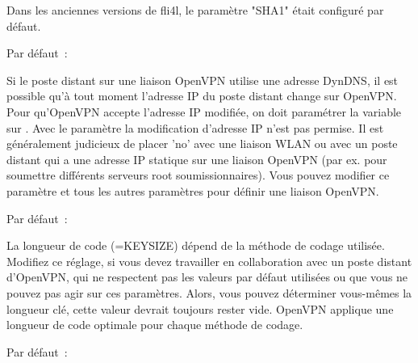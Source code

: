 \begin{description}

  Dans les anciennes versions de fli4l, le paramètre "SHA1" était configuré par défaut.


  Par défaut~: 

  Si le poste distant sur une liaison OpenVPN utilise une adresse DynDNS, il est
  possible qu'à tout moment l'adresse IP du poste distant change sur OpenVPN.
  Pour qu'OpenVPN accepte l'adresse IP modifiée, on doit paramétrer la variable
   sur . Avec le paramètre  la
  modification d'adresse IP n'est pas permise. Il est généralement judicieux
  de placer 'no' avec une liaison WLAN ou avec un poste distant qui a une adresse IP
  statique sur une liaison OpenVPN (par ex. pour soumettre différents serveurs
  root soumissionnaires). Vous pouvez modifier ce paramètre et tous les autres
  paramètres  pour définir une liaison OpenVPN.


  Par défaut~: 

  La longueur de code (=KEYSIZE) dépend de la méthode de codage utilisée. Modifiez
  ce réglage, si vous devez travailler en collaboration avec un poste distant
  d'OpenVPN, qui ne respectent pas les valeurs par défaut utilisées ou que vous
  ne pouvez pas agir sur ces paramètres. Alors, vous pouvez déterminer vous-mêmes
  la longueur clé, cette valeur devrait toujours rester vide. OpenVPN applique
  une longueur de code optimale pour chaque méthode de codage.


  Par défaut~: 


\end{description}

